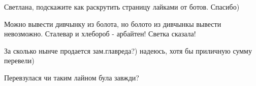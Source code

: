 \begin{itemize}
 
Светлана, подскажите как раскрутить страницу лайками от ботов. Спасибо)

 
Можно вывести дивчынку из болота, но болото из дивчынкы вывести невозможно. Сталевар и хлебороб - арбайтен! Светка сказала!

 
За сколько нынче продается зам.главреда?) надеюсь, хотя бы приличную сумму перевели)

 
Перевзулася чи таким лайном була завжди?


\end{itemize}

